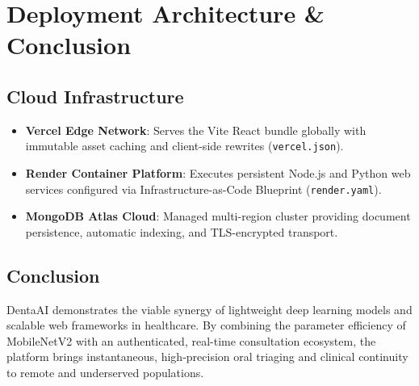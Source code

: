 \documentclass[12pt,a4paper]{report}
\begin{document}
\chapter{Deployment Architecture \& Conclusion}

\section{Cloud Infrastructure}
\begin{itemize}
    \item \textbf{Vercel Edge Network}: Serves the Vite React bundle globally with immutable asset caching and client-side rewrites (\texttt{vercel.json}).
    \item \textbf{Render Container Platform}: Executes persistent Node.js and Python web services configured via Infrastructure-as-Code Blueprint (\texttt{render.yaml}).
    \item \textbf{MongoDB Atlas Cloud}: Managed multi-region cluster providing document persistence, automatic indexing, and TLS-encrypted transport.
\end{itemize}

\section{Conclusion}
DentaAI demonstrates the viable synergy of lightweight deep learning models and scalable web frameworks in healthcare. By combining the parameter efficiency of MobileNetV2 with an authenticated, real-time consultation ecosystem, the platform brings instantaneous, high-precision oral triaging and clinical continuity to remote and underserved populations.
\end{document}
